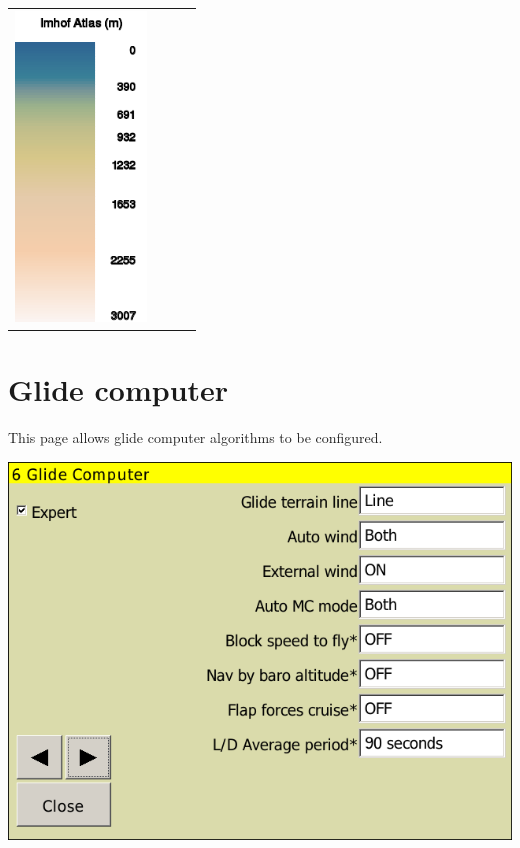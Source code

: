 \documentclass[a4paper,12pt]{refrep}
\begin{document}
\begin{maxipage}
\begin{longtable}{c c c c}
\includegraphics[angle=0,width=3.5cm,keepaspectratio='true']{figures/ramp-terrain-imhofatlas.png}
\\
\end{longtable}
\end{maxipage}


\clearpage
\section{Glide computer}\label{sec:final-glide}

This page allows glide computer algorithms to be configured.

\begin{center}
\includegraphics[angle=0,width=0.8\linewidth,keepaspectratio='true']{figures/config-glidecomputer.png}
\end{center}
\end{document}
